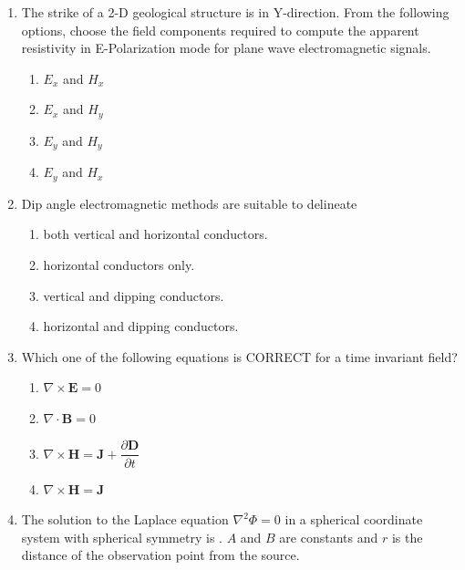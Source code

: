 \documentclass[journal,12pt,onecolumn]{IEEEtran}
\begin{document}
\begin{enumerate}
\begin{enumerate}
\item The strike of a 2-D geological structure is in Y-direction. From the following options, choose the field components required to compute the apparent resistivity in E-Polarization mode for plane wave electromagnetic signals.

\hfill{}

\begin{multicols}{4}
\begin{enumerate}[label=(\Alph*)]
\item $E_x$ and $H_x$
\item $E_x$ and $H_y$
\item $E_y$ and $H_y$
\item $E_y$ and $H_x$
\end{enumerate}
\end{multicols}

\item Dip angle electromagnetic methods are suitable to delineate

\hfill{}


\begin{enumerate}[label=(\Alph*)]
\item both vertical and horizontal conductors.
\item horizontal conductors only.
\item vertical and dipping conductors.
\item horizontal and dipping conductors.
\end{enumerate}


\item Which one of the following equations is CORRECT for a time invariant field?

\hfill{}

\begin{multicols}{2}
\begin{enumerate}[label=(\Alph*)]
\item $\nabla\times\mathbf{E}=0$
\item $\nabla\cdot\mathbf{B}=0$
\item $\nabla\times\mathbf{H}=\mathbf{J}+\dfrac{\partial\mathbf{D}}{\partial t}$
\item $\nabla\times\mathbf{H}=\mathbf{J}$
\end{enumerate}
\end{multicols}

\newpage

\item The solution to the Laplace equation $\nabla^2 \Phi =0$ in a spherical coordinate system with spherical symmetry is \underline{\hspace{3cm}}. $A$ and $B$ are constants and $r$ is the distance of the observation point from the source.


\end{enumerate}
\end{enumerate}
\end{document}
